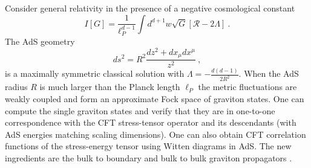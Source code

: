 \documentclass{ws-rv9x6}
\newcommand\be{\begin{equation}}
\newcommand\ee{\end{equation}}
\begin{document}
Consider general relativity in the presence of a negative cosmological
constant
\begin{equation}
I[G]=\frac{1}{\ell_{P}^{d-1}}\int d^{d+1}w\sqrt{G}\left[\mathcal{R}-2\Lambda\right]\ .\label{eq:GRactionAdS}
\end{equation}
The AdS geometry 
\be
ds^{2}=R^{2}\frac{dz^{2}+dx_{\mu}dx^{\mu}}{z^{2}}\ ,
\ee
is a maximally symmetric classical solution with $\Lambda=-\frac{d(d-1)}{2R^{2}}$.
When the AdS radius $R$ is much larger than the Planck length $\ell_{P}$
the metric fluctuations are weakly coupled and form an approximate
Fock space of  graviton states. One can compute the single graviton
states and verify that they are in one-to-one correspondence with
the CFT stress-tensor operator and its descendants (with AdS energies
matching scaling dimensions). One can also obtain CFT correlation
functions of the stress-energy tensor using Witten diagrams in AdS.
The new ingredients are the bulk to boundary and bulk to bulk graviton
propagators \cite{hep-th/9804083, hep-th/9807097, hep-th/9902042, hep-th/9903196, arXiv:1404.5625}.
\end{document}
